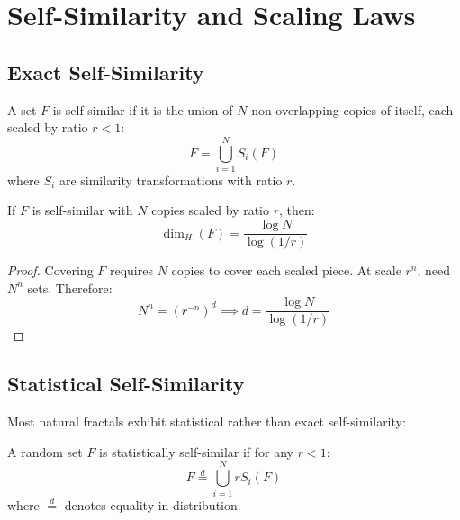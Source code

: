 \section{Self-Similarity and Scaling Laws}

\subsection{Exact Self-Similarity}

\begin{definition}
A set $F$ is self-similar if it is the union of $N$ non-overlapping copies of itself, each scaled by ratio $r < 1$:
\begin{equation}
    F = \bigcup_{i=1}^N S_i(F)
\end{equation}
where $S_i$ are similarity transformations with ratio $r$.
\end{definition}

\begin{theorem}
If $F$ is self-similar with $N$ copies scaled by ratio $r$, then:
\begin{equation}
    \dim_H(F) = \frac{\log N}{\log(1/r)}
\end{equation}
\end{theorem}

\begin{proof}
Covering $F$ requires $N$ copies to cover each scaled piece. At scale $r^n$, need $N^n$ sets. Therefore:
\begin{equation}
    N^n = (r^{-n})^d \implies d = \frac{\log N}{\log(1/r)}
\end{equation}
\end{proof}

\subsection{Statistical Self-Similarity}

Most natural fractals exhibit statistical rather than exact self-similarity:

\begin{definition}
A random set $F$ is statistically self-similar if for any $r < 1$:
\begin{equation}
    F \stackrel{d}{=} \bigcup_{i=1}^N r S_i(F)
\end{equation}
where $\stackrel{d}{=}$ denotes equality in distribution.
\end{definition}

